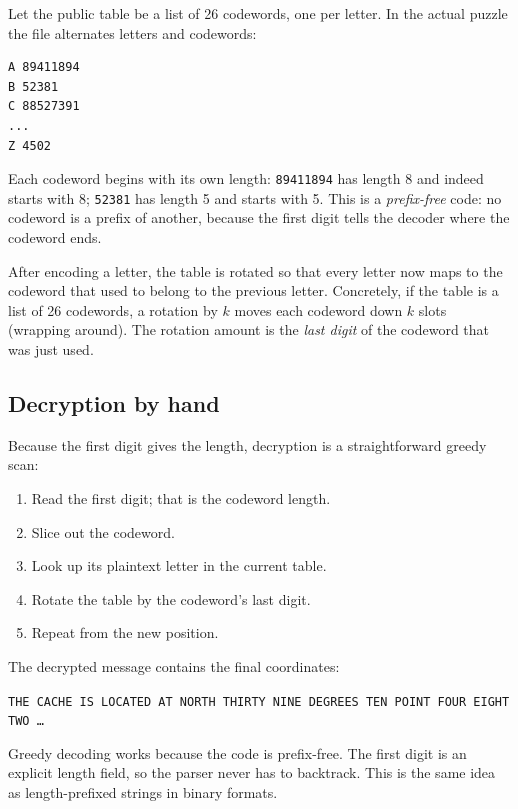 \documentclass[11pt]{article}
\begin{document}
Let the public table be a list of 26 codewords, one per letter.  In the actual
puzzle the file alternates letters and codewords:

\begin{lstlisting}
A 89411894
B 52381
C 88527391
...
Z 4502
\end{lstlisting}

Each codeword begins with its own length: \texttt{89411894} has length 8 and
indeed starts with 8; \texttt{52381} has length 5 and starts with 5.  This is
a \emph{prefix-free} code: no codeword is a prefix of another, because the
first digit tells the decoder where the codeword ends.

After encoding a letter, the table is rotated so that every letter now maps to
the codeword that used to belong to the previous letter.  Concretely, if the
table is a list of 26 codewords, a rotation by $k$ moves each codeword down
$k$ slots (wrapping around).  The rotation amount is the \emph{last digit} of
the codeword that was just used.

\subsection{Decryption by hand}

Because the first digit gives the length, decryption is a straightforward
greedy scan:

\begin{enumerate}[label=\arabic*.]
  \item Read the first digit; that is the codeword length.
  \item Slice out the codeword.
  \item Look up its plaintext letter in the current table.
  \item Rotate the table by the codeword's last digit.
  \item Repeat from the new position.
\end{enumerate}

The decrypted message contains the final coordinates:

\begin{center}
\texttt{THE CACHE IS LOCATED AT NORTH THIRTY NINE DEGREES TEN POINT FOUR EIGHT TWO \dots}
\end{center}

\begin{lesson}
Greedy decoding works because the code is prefix-free.  The first digit is an
explicit length field, so the parser never has to backtrack.  This is the same
idea as length-prefixed strings in binary formats.
\end{lesson}
\end{document}
